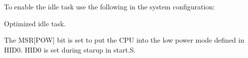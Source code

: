 To enable the idle task use the following in the system configuration\+:


\begin{DoxyCode}{0}
\DoxyCodeLine{\textcolor{preprocessor}{\#include <bsp.h>}}
\DoxyCodeLine{}
\DoxyCodeLine{\textcolor{preprocessor}{\#define CONFIGURE\_INIT}}
\DoxyCodeLine{}
\DoxyCodeLine{\textcolor{preprocessor}{\#define CONFIGURE\_IDLE\_TASK\_BODY bsp\_idle\_thread}}
\DoxyCodeLine{}
\end{DoxyCode}


Optimized idle task.

The M\+SR\mbox{[}P\+OW\mbox{]} bit is set to put the C\+PU into the low power mode defined in H\+I\+D0. H\+I\+D0 is set during starup in start.\+S. 